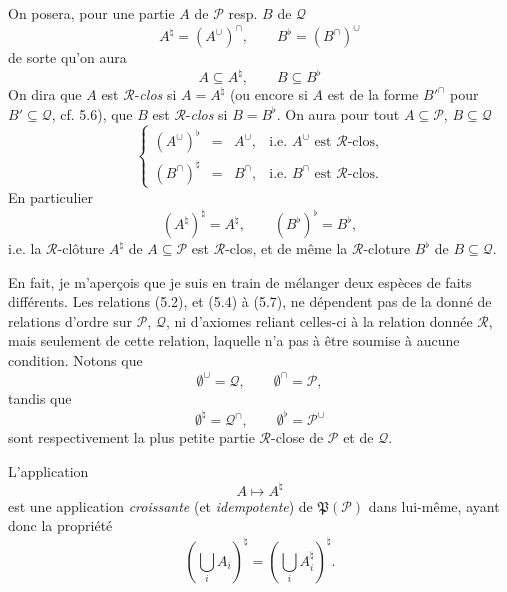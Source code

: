 \documentclass[11pt]{article}
\newcommand{\printedpage}[1]{\marginpar{\footnotesize p.~#1}}
\newcommand{\msp}[1]{\marginpar{\footnotesize [#1]}}
\newcommand{\cP}{\mathcal{P}}
\newcommand{\cQ}{\mathcal{Q}}
\newcommand{\cR}{\mathcal{R}}
\newcommand{\fP}{\mathfrak{P}}
\begin{document}
\printedpage{44}

On posera, pour une partie $A$ de $\cP$ resp. $B$ de $\cQ$
\[
A^{\natural} = (A^{\cup})^{\cap}, \qquad B^{\flat} = (B^{\cap})^{\cup}
\tag*{(5.4)}
\]
de sorte qu'on aura
\[
A \subseteq A^{\natural}, \qquad B \subseteq B^{\flat}
\tag*{(5.5)}
\]
On dira que $A$ est $\cR$-\textit{clos} si $A = A^{\natural}$ (ou encore si $A$ est de la forme $B'^{\cap}$ pour $B' \subseteq \cQ$, cf. 5.6), que
\msp{71}
$B$ est $\cR$-\textit{clos} si $B = B^{\flat}$. On aura pour tout $A \subseteq \cP$, $B \subseteq \cQ$
\[
\left\{
\begin{array}{rcll}
(A^{\cup})^{\flat} & = & A^{\cup}, & \text{i.e. } A^{\cup} \text{ est } \cR\text{-clos,}\\[1ex]
(B^{\cap})^{\natural} & = & B^{\cap}, & \text{i.e. } B^{\cap} \text{ est } \cR\text{-clos.}
\end{array}
\right.
\tag*{(5.6)}
\]
En particulier
\[
(A^{\natural})^{\natural} = A^{\natural}, \qquad (B^{\flat})^{\flat} = B^{\flat},
\tag*{(5.7)}
\]
i.e. la $\cR$-clôture $A^{\natural}$ de $A \subseteq \cP$ est $\cR$-clos, et de même la $\cR$-cloture $B^{\flat}$ de $B \subseteq \cQ$. %

En fait, je m'aperçois que je suis en train de mélanger deux espèces de faits différents. Les relations (5.2), et (5.4) à (5.7), ne dépendent pas de la donné de relations d'ordre sur $\cP$, $\cQ$, ni d'axiomes reliant celles-ci à la relation donnée $\cR$, mais seulement de cette relation, laquelle n'a pas à être soumise à aucune condition. Notons que %
\[
\emptyset^{\cup} = \cQ, \qquad \emptyset^{\cap} = \cP,
\tag*{(5.8)}
\]
tandis que
\[
\emptyset^{\natural} = \cQ^{\cap}, \qquad \emptyset^{\flat} = \cP^{\cup}
\tag*{(5.9)}
\]
sont respectivement la plus petite partie $\cR$-close de $\cP$ et de $\cQ$.

L'application
\[
A \longmapsto A^{\natural}
\tag*{(5.10)}
\]
est une application \textit{croissante} (et \textit{idempotente}) de $\fP(\cP)$ dans lui-même, ayant donc la propriété
\msp{72}
\[
(\bigcup_i A_i)^{\natural} = (\bigcup_i A_i^{\natural})^{\natural}.
\]

\printedpage{45}
\end{document}
